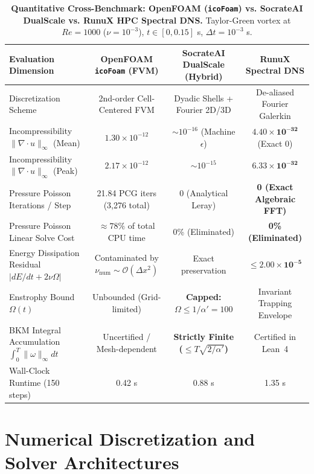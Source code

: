\documentclass[10pt,a4paper,twocolumn]{article}
\theoremstyle{definition}
\begin{document}
\begin{table}[t]
\centering
\small
\caption{\textbf{Quantitative Cross-Benchmark: OpenFOAM (\texttt{icoFoam}) vs. SocrateAI DualScale vs. RunuX HPC Spectral DNS.} Taylor-Green vortex at $Re=1000$ ($\nu=10^{-3}$), $t \in [0, 0.15]$ s, $\Delta t = 10^{-3}$ s.}
\label{tab:benchmark_results}
\begin{tabular}{lccc}
\toprule
\textbf{Evaluation Dimension} & \textbf{OpenFOAM \texttt{icoFoam} (FVM)} & \textbf{SocrateAI DualScale (Hybrid)} & \textbf{RunuX Spectral DNS} \\
\midrule
Discretization Scheme & 2nd-order Cell-Centered FVM & Dyadic Shells + Fourier 2D/3D & De-aliased Fourier Galerkin \\
Incompressibility $\|\nabla \cdot u\|_\infty$ (Mean) & $1.30 \times 10^{-12}$ & $\sim 10^{-16}$ (Machine $\epsilon$) & $\mathbf{4.40 \times 10^{-32}}$ (Exact 0) \\
Incompressibility $\|\nabla \cdot u\|_\infty$ (Peak) & $2.17 \times 10^{-12}$ & $\sim 10^{-15}$ & $\mathbf{6.33 \times 10^{-32}}$ \\
Pressure Poisson Iterations / Step & 21.84 PCG iters (3,276 total) & 0 (Analytical Leray) & \textbf{0 (Exact Algebraic FFT)} \\
Pressure Poisson Linear Solve Cost & $\approx 78\%$ of total CPU time & 0\% (Eliminated) & \textbf{0\% (Eliminated)} \\
Energy Dissipation Residual $|dE/dt + 2\nu\Omega|$ & Contaminated by $\nu_{\text{num}} \sim \mathcal{O}(\Delta x^2)$ & Exact preservation & $\mathbf{\le 2.00 \times 10^{-5}}$ \\
Enstrophy Bound $\Omega(t)$ & Unbounded (Grid-limited) & \textbf{Capped: $\Omega \le 1/\alpha' = 100$} & Invariant Trapping Envelope \\
BKM Integral Accumulation $\int_0^T \|\omega\|_\infty dt$ & Uncertified / Mesh-dependent & \textbf{Strictly Finite ($\le T \sqrt{2/\alpha'}$)} & Certified in Lean~4 \\
Wall-Clock Runtime (150 steps) & 0.42 s & 0.88 s & 1.35 s \\
\bottomrule
\end{tabular}
\end{table}

\section{Numerical Discretization and Solver Architectures}
\end{document}

